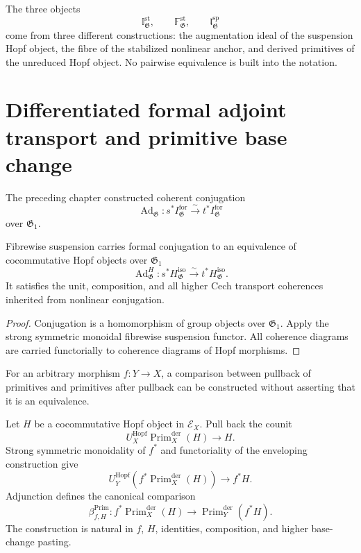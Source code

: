 \begin{remark}
The three objects
\[
    \mathbb I^{\mathrm{st}}_{\mathfrak G},
    \qquad
    \mathbb F^{\mathrm{st}}_{\mathfrak G},
    \qquad
    \mathfrak l^{\mathrm{sp}}_{\mathfrak G}
\]
come from three different constructions: the augmentation ideal of the
suspension Hopf object, the fibre of the stabilized nonlinear anchor, and
derived primitives of the unreduced Hopf object.  No pairwise equivalence is
built into the notation.
\end{remark}

\section{Differentiated formal adjoint transport and primitive base change}
\label{sec:bnla-adjoint-transport}

The preceding chapter constructed coherent conjugation
\[
    \operatorname{Ad}_{\mathfrak G}:
    s^*I^{\mathrm{for}}_{\mathfrak G}
    \xrightarrow{\sim}
    t^*I^{\mathrm{for}}_{\mathfrak G}
\]
over $\mathfrak G_1$.

\begin{proposition}
\label{prop:bnla-hopf-adjoint-transport}
Fibrewise suspension carries formal conjugation to an equivalence of
cocommutative Hopf objects over $\mathfrak G_1$
\[
    \operatorname{Ad}^{H}_{\mathfrak G}:
    s^*H^{\mathrm{iso}}_{\mathfrak G}
    \xrightarrow{\sim}
    t^*H^{\mathrm{iso}}_{\mathfrak G}.
\]
It satisfies the unit, composition, and all higher Cech transport coherences
inherited from nonlinear conjugation.
\end{proposition}

\begin{proof}
Conjugation is a homomorphism of group objects over $\mathfrak G_1$.  Apply the
strong symmetric monoidal fibrewise suspension functor.  All coherence diagrams
are carried functorially to coherence diagrams of Hopf morphisms.
\end{proof}

For an arbitrary morphism $f:Y\to X$, a comparison between pullback of
primitives and primitives after pullback can be constructed without asserting
that it is an equivalence.

\begin{definition}
\label{con:bnla-primitive-base-change}
Let $H$ be a cocommutative Hopf object in $\mathcal E_X$.  Pull back the counit
\[
    U_X^{\mathrm{Hopf}}
    \operatorname{Prim}^{\mathrm{der}}_X(H)
    \longrightarrow H.
\]
Strong symmetric monoidality of $f^*$ and functoriality of the enveloping
construction give
\[
    U_Y^{\mathrm{Hopf}}
    \left(
        f^*\operatorname{Prim}^{\mathrm{der}}_X(H)
    \right)
    \longrightarrow
    f^*H.
\]
Adjunction defines the canonical comparison
\[
    \boxed{
    \beta^{\mathrm{Prim}}_{f,H}:
    f^*\operatorname{Prim}^{\mathrm{der}}_X(H)
    \longrightarrow
    \operatorname{Prim}^{\mathrm{der}}_Y(f^*H).}
\]
The construction is natural in $f$, $H$, identities, composition, and higher
base-change pasting.
\end{definition}

